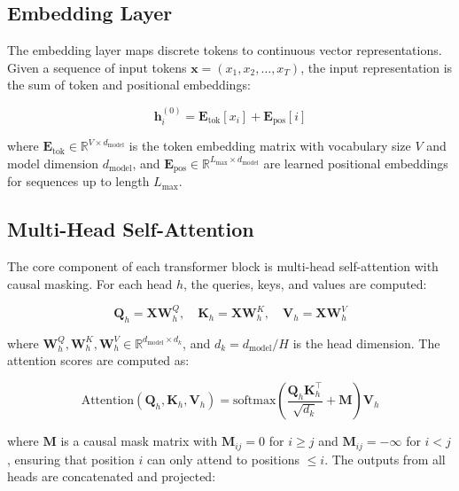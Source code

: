 \documentclass[conference]{IEEEtran}
\begin{document}
\subsection{Embedding Layer}

The embedding layer maps discrete tokens to continuous vector representations. Given a sequence of input tokens $\mathbf{x} = (x_1, x_2, \dots, x_T)$, the input representation is the sum of token and positional embeddings:

\begin{equation}
\mathbf{h}_i^{(0)} = \mathbf{E}_{\text{tok}}[x_i] + \mathbf{E}_{\text{pos}}[i]
\end{equation}

where $\mathbf{E}_{\text{tok}} \in \mathbb{R}^{V \times d_{\text{model}}}$ is the token embedding matrix with vocabulary size $V$ and model dimension $d_{\text{model}}$, and $\mathbf{E}_{\text{pos}} \in \mathbb{R}^{L_{\max} \times d_{\text{model}}}$ are learned positional embeddings for sequences up to length $L_{\max}$.

\subsection{Multi-Head Self-Attention}

The core component of each transformer block is multi-head self-attention with causal masking. For each head $h$, the queries, keys, and values are computed:

\begin{equation}
\mathbf{Q}_h = \mathbf{X}\mathbf{W}_h^Q,\quad
\mathbf{K}_h = \mathbf{X}\mathbf{W}_h^K,\quad
\mathbf{V}_h = \mathbf{X}\mathbf{W}_h^V
\end{equation}

where $\mathbf{W}_h^Q, \mathbf{W}_h^K, \mathbf{W}_h^V \in \mathbb{R}^{d_{\text{model}} \times d_k}$, and $d_k = d_{\text{model}} / H$ is the head dimension. The attention scores are computed as:

\begin{equation}
\text{Attention}(\mathbf{Q}_h, \mathbf{K}_h, \mathbf{V}_h) = \text{softmax}\left(\frac{\mathbf{Q}_h\mathbf{K}_h^\top}{\sqrt{d_k}} + \mathbf{M}\right)\mathbf{V}_h
\end{equation}

where $\mathbf{M}$ is a causal mask matrix with $\mathbf{M}_{ij} = 0$ for $i \geq j$ and $\mathbf{M}_{ij} = -\infty$ for $i < j$, ensuring that position $i$ can only attend to positions $\leq i$. The outputs from all heads are concatenated and projected:
\end{document}
